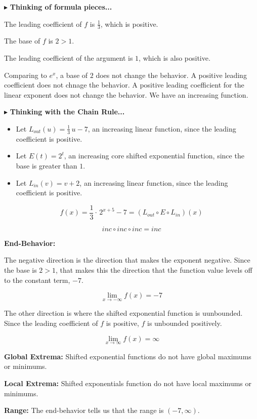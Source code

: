 \documentclass{ximera}
\begin{document}
\begin{example}
$\blacktriangleright$ \textbf{Thinking of formula pieces...}



The leading coefficient of $f$ is $\frac{1}{3}$, which is positive. 

The base of $f$ is $2 > 1$.

The leading coefficient of the argument is $1$, which is also positive.  



Comparing to $e^x$, a base of $2$ does not change the behavior. A positive leading coefficient does not chnage the behavior.  A positive leading coefficient for the linear exponent does not change the behavior.  We have an increasing function. 





$\blacktriangleright$ \textbf{Thinking with the Chain Rule...}




\begin{itemize}
\item Let $L_{out}(u) = \frac{1}{3} \, u - 7$, an increasing linear function, since the leading coefficient is positive.
\item Let $E(t) = 2^t$, an increasing core shifted exponential function, since the base is greater than $1$.
\item Let $L_{in}(v) = v + 2$, an increasing linear function, since the leading coefficient is positive.
\end{itemize}


\[
f(x) = \frac{1}{3} \cdot \, 2^{x+5} - 7 = (L_{out} \circ E \circ L_{in})(x)
\]

\[  inc \circ inc \circ inc = inc  \]

\textbf{End-Behavior:} 



The negative direction is the direction that makes the exponent negative.  Since the base is $2 > 1$, that makes this the direction that the function value levels off to the constant term, $-7$. 

\[
\lim\limits_{x \to -\infty} f(x) = -7
\]




The other direction is where the shifted exponential function is uunbounded.  Since the leading coefficient of $f$ is positive, $f$ is unbounded positively. 



\[
\lim\limits_{x \to \infty} f(x) = \infty
\]







\textbf{Global Extrema:}  Shifted exponential functions do not have global maximums or minimums. 


\textbf{Local Extrema:}  Shifted exponentials function do not have local maximums or minimums. 



\textbf{Range:} The end-behavior tells us that the range is $(-7, \infty)$.





\end{example}
\end{document}
